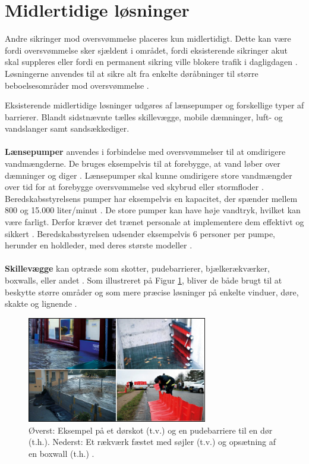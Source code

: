 \section{Midlertidige løsninger}\label{sc:midlertidige}
Andre sikringer mod oversvømmelse placeres kun midlertidigt. Dette kan være fordi oversvømmelse sker sjældent i området, fordi eksisterende sikringer akut skal suppleres eller fordi en permanent sikring ville blokere trafik i dagligdagen \cite{fema2013}. Løsningerne anvendes til at sikre alt fra enkelte døråbninger til større beboelsesområder mod oversvømmelse \cite{barrierekatalog}. 
\par
Eksisterende midlertidige løsninger udgøres af lænsepumper og forskellige typer af barrierer. Blandt sidstnævnte tælles skillevægge, mobile dæmninger, luft- og vandslanger samt sandsækkediger. 
\\\\
\textbf{Lænsepumper} anvendes i forbindelse med oversvømmelser til at omdirigere vandmængderne. De bruges eksempelvis til at forebygge, at vand løber over dæmninger og diger \cite{morrison2012}. Lænsepumper skal kunne omdirigere store vandmængder over tid for at forebygge oversvømmelse ved skybrud eller stormfloder \cite{laensepumper}. Beredskabsstyrelsens pumper har eksempelvis en kapacitet, der spænder mellem 800 og 15.000 liter/minut \cite{brslaensepumper}. De store pumper kan have høje vandtryk, hvilket kan være farligt. Derfor kræver det trænet personale at implementere dem effektivt og sikkert \cite{safework2013}. Beredskabsstyrelsen udsender eksempelvis 6 personer per pumpe, herunder en holdleder, med deres største modeller \cite{brslaensepumper}.
\\\\
\textbf{Skillevægge} kan optræde som skotter, pudebarrierer, bjælkerækværker, boxwalls, eller andet \cite{barrierekatalog}. Som illustreret på Figur \ref{skillevaegge}, bliver de både brugt til at beskytte større områder og som mere præcise løsninger på enkelte vinduer, døre, skakte og lignende \cite{barrierguide2005}.

\begin{figure}[H]
    \centering
    \includegraphics[width=0.7\textwidth]{figures/Skillevaegge.png}
    \caption{Øverst: Eksempel på et dørskot (t.v.) og en pudebarriere til en dør (t.h.). Nederst: Et rækværk fæstet med søjler (t.v.) og opsætning af en boxwall (t.h.) \cite{barrierekatalog}.}
    \label{skillevaegge}
\end{figure}

